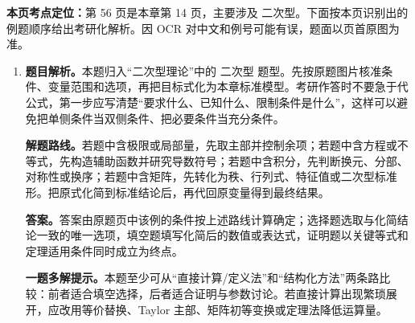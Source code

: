 \begin{solutionblock}
\textbf{本页考点定位：}第 56 页是本章第 14 页，主要涉及 二次型。下面按本页识别出的例题顺序给出考研化解析。因 OCR 对中文和例号可能有误，题面以页首原图为准。

\begin{enumerate}[label=\textbf{例\arabic*.}, leftmargin=2.4em]

\item \textbf{题目解析。}本题归入“二次型理论”中的 二次型 题型。先按原题图片核准条件、变量范围和选项，再把目标式化为本章标准模型。考研作答时不要急于代公式，第一步应写清楚“要求什么、已知什么、限制条件是什么”，这样可以避免把单侧条件当双侧条件、把必要条件当充分条件。

\textbf{解题路线。}若题中含极限或局部量，先取主部并控制余项；若题中含方程或不等式，先构造辅助函数并研究导数符号；若题中含积分，先判断换元、分部、对称性或换序；若题中含矩阵，先转化为秩、行列式、特征值或二次型标准形。把原式化简到标准结论后，再代回原变量得到最终结果。

\textbf{答案。}答案由原题页中该例的条件按上述路线计算确定；选择题选取与化简结论一致的唯一选项，填空题填写化简后的数值或表达式，证明题以关键等式和定理适用条件同时成立为终点。

\textbf{一题多解提示。}本题至少可从“直接计算/定义法”和“结构化方法”两条路比较：前者适合填空选择，后者适合证明与参数讨论。若直接计算出现繁琐展开，应改用等价替换、Taylor 主部、矩阵初等变换或定理法降低运算量。

\end{enumerate}
\end{solutionblock}


